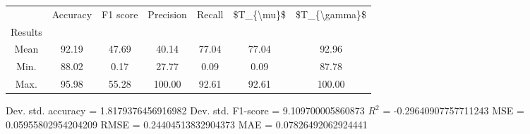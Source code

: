 \begin{tabular}{|c|c|c|c|c|c|c|}
\toprule
{} &  Accuracy &  F1 score &  Precision &  Recall &  \$T\_\{\textbackslash mu\}\$ &  \$T\_\{\textbackslash gamma\}\$ \\
Results &           &           &            &         &            &               \\
\hline
Mean    &     92.19 &     47.69 &      40.14 &   77.04 &      77.04 &         92.96 \\
Min.    &     88.02 &      0.17 &      27.77 &    0.09 &       0.09 &         87.78 \\
Max.    &     95.98 &     55.28 &     100.00 &   92.61 &      92.61 &        100.00 \\
\bottomrule
\end{tabular}

 Dev. std. accuracy = 1.8179376456916982
 Dev. std. F1-score = 9.109700005860873
 $R^2$ = -0.29640907757711243
 MSE = 0.05955802954204209
 RMSE = 0.24404513832904373
 MAE = 0.07826492062924441